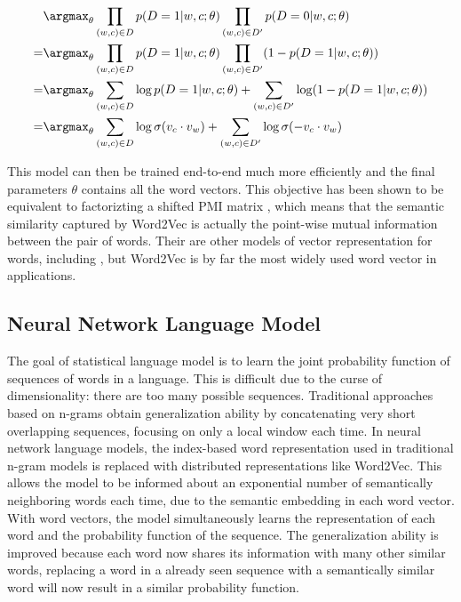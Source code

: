 \begin{align*}
    &\argmax_{\theta}\prod_{(w,c)\in D} p(D=1|w,c;\theta) \prod_{(w,c)\in D'}p(D=0|w,c;\theta) \\
    =&\argmax_{\theta}\prod_{(w,c)\in D} p(D=1|w,c;\theta) \prod_{(w,c)\in D'}(1-p(D=1|w,c;\theta)) \\
    =&\argmax_{\theta}\sum_{(w,c)\in D} \log p(D=1|w,c;\theta) + \sum_{(w,c)\in D'} \log(1-p(D=1|w,c;\theta)) \\
    =&\argmax_{\theta}\sum_{(w,c)\in D} \log\sigma(v_c\cdot v_w) + \sum_{(w,c)\in D'} \log\sigma(-v_c\cdot v_w)
\end{align*}

This model can then be trained end-to-end much more efficiently and the final parameters $\theta$ contains all the word vectors. This objective has been shown to be equivalent to factorizting a shifted PMI matrix \cite{levy2014neural}, which means that the semantic similarity captured by Word2Vec is actually the point-wise mutual information between the pair of words. Their are other models of vector representation for words, including \cite{pennington2014glove,shazeer2016swivel}, but Word2Vec is by far the most widely used word vector in applications.


\subsection{Neural Network Language Model}

The goal of statistical language model is to learn the joint probability function of sequences of words in a language. This is difficult due to the curse of dimensionality: there are too many possible sequences. Traditional approaches based on n-grams obtain generalization ability by concatenating very short overlapping sequences, focusing on only a local window each time. In neural network language models, the index-based word representation used in traditional n-gram models is replaced with distributed representations like Word2Vec. This allows the model to be informed about an exponential number of semantically neighboring words each time, due to the semantic embedding in each word vector. With word vectors, the model simultaneously learns the representation of each word and the probability function of the sequence. The generalization ability is improved because each word now shares its information with many other similar words, replacing a word in a already seen sequence with a semantically similar word will now result in a similar probability function.

